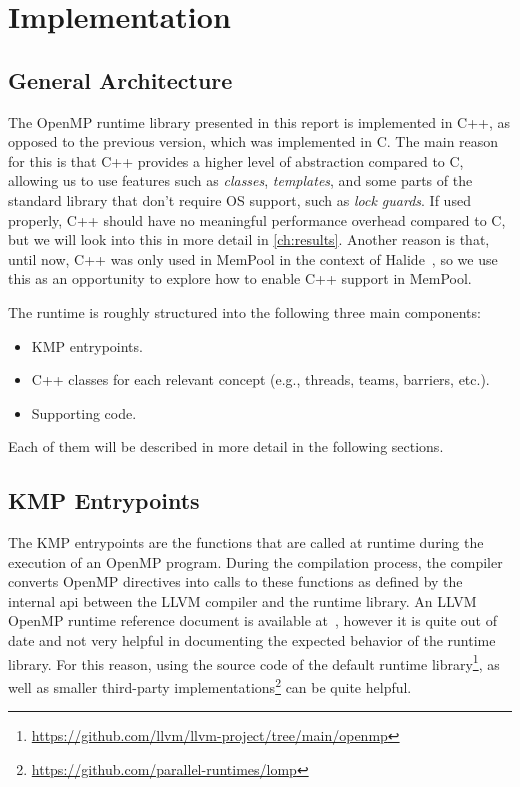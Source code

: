 \chapter{Implementation}
\label{ch:implementation}

\section{General Architecture}
\label{sec:general-architecture}

The OpenMP runtime library presented in this report is implemented in C++, as opposed to the
previous version, which was implemented in C. The main reason for this is that C++ provides a higher
level of abstraction compared to C, allowing us to use features such as \emph{classes},
\emph{templates}, and some parts of the standard library that don't require OS support, such as
\emph{lock guards}. If used properly, C++ should have no meaningful performance overhead compared to
C, but we will look into this in more detail in \autoref{ch:results}. Another reason is that, until
now, C++ was only used in MemPool in the context of Halide~\cite{halide}, so we use this as an
opportunity to explore how to enable C++ support in MemPool.

The runtime is roughly structured into the following three main components:

\begin{itemize}
	\item KMP entrypoints.
	\item C++ classes for each relevant concept (e.g., threads, teams, barriers, etc.).
	\item Supporting code.
\end{itemize}

Each of them will be described in more detail in the following sections.

\section{KMP Entrypoints}

The KMP entrypoints are the functions that are called at runtime during the execution of an OpenMP
program. During the compilation process, the compiler converts OpenMP directives into calls to these
functions as defined by the internal \gls{api} between the LLVM compiler and the runtime library. An
LLVM OpenMP runtime reference document is available at~\cite{kmpref}, however it is quite out of
date and not very helpful in documenting the expected behavior of the runtime library. For this
reason, using the source code of the default runtime
library\footnote{\url{https://github.com/llvm/llvm-project/tree/main/openmp}}, as well as smaller
third-party implementations\footnote{\url{https://github.com/parallel-runtimes/lomp}} can be quite
helpful.

